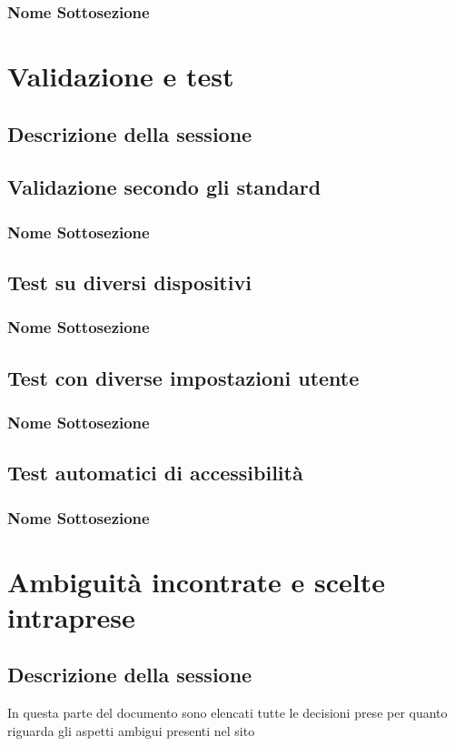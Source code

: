 \documentclass[openany, a4paper, 12pt]{report}
\begin{document}
	\subsection{Nome Sottosezione}
	
	\chapter{Validazione e test}
	\section{Descrizione della sessione}
	\section{Validazione secondo gli standard}
	\subsection{Nome Sottosezione}
	\section{Test su diversi dispositivi}
	\subsection{Nome Sottosezione}
	\section{Test con diverse impostazioni utente}
	\subsection{Nome Sottosezione}
	\section{Test automatici di accessibilità}
	\subsection{Nome Sottosezione}
	
	\chapter{Ambiguità incontrate e scelte intraprese}
		\section{Descrizione della sessione}
			In questa parte del documento sono elencati tutte le decisioni prese per quanto riguarda gli aspetti ambigui presenti nel sito\\
\end{document}
